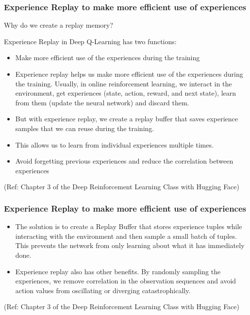 \begin{frame}[fragile]\frametitle{Experience Replay to make more efficient use of experiences}

Why do we create a replay memory?

Experience Replay in Deep Q-Learning has two functions:


\begin{itemize}
\item Make more efficient use of the experiences during the training
\item Experience replay helps us make more efficient use of the experiences during the training. Usually, in online reinforcement learning, we interact in the environment, get experiences (state, action, reward, and next state), learn from them (update the neural network) and discard them.
\item But with experience replay, we create a replay buffer that saves experience samples that we can reuse during the training.
\item This allows us to learn from individual experiences multiple times.
\item Avoid forgetting previous experiences and reduce the correlation between experiences
\end{itemize}


{\tiny (Ref: Chapter 3 of the Deep Reinforcement Learning Class with Hugging Face)}

\end{frame}

\begin{frame}[fragile]\frametitle{Experience Replay to make more efficient use of experiences}


\begin{itemize}
\item The solution is to create a Replay Buffer that stores experience tuples while interacting with the environment and then sample a small batch of tuples. This prevents the network from only learning about what it has immediately done.
\item Experience replay also has other benefits. By randomly sampling the experiences, we remove correlation in the observation sequences and avoid action values from oscillating or diverging catastrophically.
\end{itemize}


{\tiny (Ref: Chapter 3 of the Deep Reinforcement Learning Class with Hugging Face)}

\end{frame}

